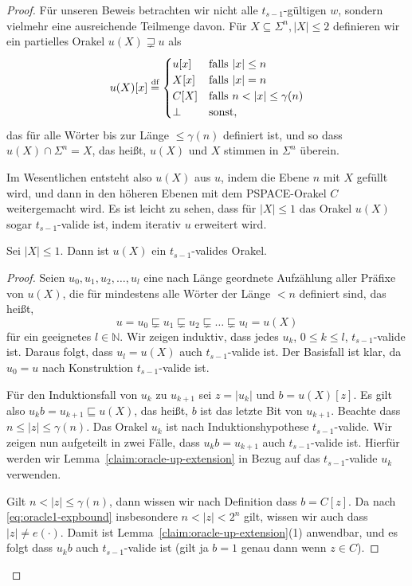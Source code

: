 \begin{proof}
Für unseren Beweis betrachten wir nicht alle $t_{s-1}$-gültigen $w$, sondern vielmehr eine ausreichende Teilmenge davon.
Für $X \subseteq \Sigma^n, |X|\leq 2$ definieren wir ein partielles Orakel $u(X)\sqsupsetneq u$ als
\[
    u(X)[x] \defeq \begin{cases} u[x] & \text{falls $|x|\leq n$}\\
    X[x] & \text{falls $|x|=n$}\\
    C[X] & \text{falls $n<|x|\leq \gamma(n)$} \\ \bot & \text{sonst}, \end{cases}
\]
das für alle Wörter bis zur Länge $\leq\gamma(n)$ definiert ist, und so dass $u(X) \cap \Sigma^n = X$, das heißt, $u(X)$ und $X$ stimmen in $\Sigma^n$ überein.

Im Wesentlichen entsteht also $u(X)$ aus $u$, indem die Ebene $n$ mit $X$ gefüllt wird, und dann in den höheren Ebenen mit dem PSPACE-Orakel $C$ weitergemacht wird.
Es ist leicht zu sehen, dass für $|X|\leq 1$ das Orakel $u(X)$ sogar $t_{s-1}$-valide ist, indem iterativ $u$ erweitert wird.

\begin{claim}
    Sei $|X|\leq 1$. Dann ist $u(X)$ ein $t_{s-1}$-valides Orakel.
\end{claim}
\begin{proof}
    Seien $u_0, u_1, u_2, \dots, u_l$ eine nach Länge geordnete Aufzählung aller Präfixe von $u(X)$, die für mindestens alle Wörter der Länge $<n$ definiert sind, das heißt, 
    \[ u = u_0 \sqsubsetneq u_1 \sqsubsetneq u_2 \sqsubsetneq \dots \sqsubsetneq u_l = u(X) \]
    für ein geeignetes $l\in\mathbb N$.
    Wir zeigen induktiv, dass jedes $u_k$, $0\leq k\leq l$, $t_{s-1}$-valide ist.
    Daraus folgt, dass $u_l=u(X)$ auch $t_{s-1}$-valide ist.
    Der Basisfall ist klar, da $u_0 = u$ nach Konstruktion $t_{s-1}$-valide ist.

    Für den Induktionsfall von $u_k$ zu $u_{k+1}$ sei $z=|u_k|$ und $b=u(X)[z]$. Es gilt also $u_kb=u_{k+1}\sqsubseteq u(X)$, das heißt, $b$ ist das letzte Bit von $u_{k+1}$.
    Beachte dass $n\leq |z|\leq \gamma(n)$.
    Das Orakel $u_k$ ist nach Induktionshypothese $t_{s-1}$-valide.
    Wir zeigen nun aufgeteilt in zwei Fälle, dass $u_kb=u_{k+1}$ auch $t_{s-1}$-valide ist. Hierfür werden wir Lemma~\ref{claim:oracle-up-extension} in Bezug auf das $t_{s-1}$-valide $u_k$ verwenden.

    Gilt $n<|z|\leq \gamma(n)$, dann wissen wir nach Definition dass $b=C[z]$. Da nach \eqref{eq:oracle1-expbound} insbesondere $n<|z|<2^n$ gilt, wissen wir auch dass $|z|\neq e(\cdot)$. Damit ist Lemma~\ref{claim:oracle-up-extension}(1) anwendbar, und es folgt dass $u_kb$ auch $t_{s-1}$-valide ist (gilt ja $b=1$ genau dann wenn $z\in C$).


\end{proof}
\end{proof}
